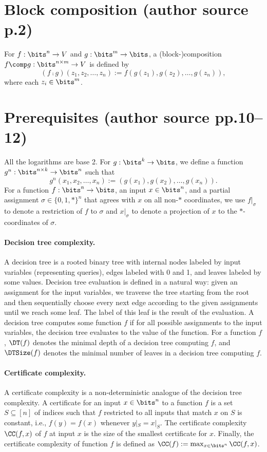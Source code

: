 \section*{Block composition (author source p.2)}
For $f:\bits^n\to V$ and $g:\bits^m\to\bits$, a (block-)composition $f\comp g:\bits^{n\times m}\to V$ is defined by
\[(f\comp g)(z_1,z_2,\ldots,z_n):=f(g(z_1),g(z_2),\ldots,g(z_n)),\]
where each $z_i\in\bits^m$.
\section*{Prerequisites (author source pp.10--12)}
All the logarithms are base 2. For $g:\bits^k\to\bits$, we define a function $g^n:\bits^{n\times k}\to\bits^n$ such that
\[g^n(x_1,x_2,\ldots,x_n):=(g(x_1),g(x_2),\ldots,g(x_n)).\]
For a function $f:\bits^n\to\bits$, an input $x\in\bits^n$, and a partial assignment $\sigma\in\{0,1,*\}^n$ that agrees with $x$ on all non-$*$ coordinates, we use $f|_\sigma$ to denote a restriction of $f$ to $\sigma$ and $x|_\sigma$ to denote a projection of $x$ to the $*$-coordinates of $\sigma$.
\paragraph{Decision tree complexity.} A decision tree is a rooted binary tree with internal nodes labeled by input variables (representing queries), edges labeled with 0 and 1, and leaves labeled by some values. Decision tree evaluation is defined in a natural way: given an assignment for the input variables, we traverse the tree starting from the root and then sequentially choose every next edge according to the given assignments until we reach some leaf. The label of this leaf is the result of the evaluation. A decision tree computes some function $f$ if for all possible assignments to the input variables, the decision tree evaluates to the value of the function. For a function $f$, $\DT(f)$ denotes the minimal depth of a decision tree computing $f$, and $\DTSize(f)$ denotes the minimal number of leaves in a decision tree computing $f$.
\paragraph{Certificate complexity.} A certificate complexity is a non-deterministic analogue of the decision tree complexity. A certificate for an input $x\in\bits^n$ to a function $f$ is a set $S\subseteq[n]$ of indices such that $f$ restricted to all inputs that match $x$ on $S$ is constant, i.e., $f(y)=f(x)$ whenever $y|_S=x|_S$. The certificate complexity $\CC(f,x)$ of $f$ at input $x$ is the size of the smallest certificate for $x$. Finally, the certificate complexity of function $f$ is defined as $\CC(f):=\max_{x\in\bits^n}\CC(f,x)$.
